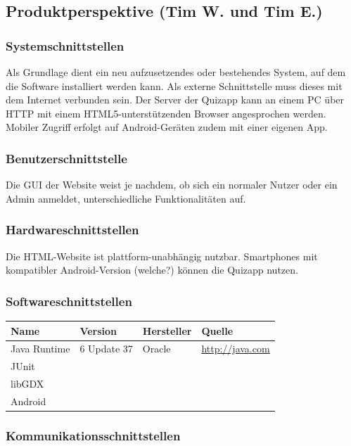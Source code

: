 \documentclass[fontsize=12pt,paper=a4,twoside]{scrartcl}
\begin{document}
\subsection{Produktperspektive (Tim W. und Tim E.)}
  
\subsubsection{Systemschnittstellen}
  
Als Grundlage dient ein neu aufzusetzendes oder bestehendes System, auf dem die Software installiert werden kann. Als externe Schnittstelle muss dieses mit dem Internet verbunden sein. Der Server der Quizapp kann an einem PC über HTTP mit einem HTML5-unterstützenden Browser angesprochen werden. Mobiler Zugriff erfolgt auf Android-Geräten zudem mit einer eigenen App.

\subsubsection{Benutzerschnittstelle}

Die GUI der Website weist je nachdem, ob sich ein normaler Nutzer oder ein Admin anmeldet, unterschiedliche Funktionalitäten auf. 

\subsubsection{Hardwareschnittstellen}

Die HTML-Website ist plattform-unabhängig nutzbar. Smartphones mit kompatibler Android-Version (welche?) können die Quizapp nutzen.


\subsubsection{Softwareschnittstellen}

  \begin{tabular}{|l|l|l|l|}\hline
    \textbf{Name} & \textbf{Version} & \textbf{Hersteller} & \textbf{Quelle} \\\hline
    Java Runtime & 6 Update 37 & Oracle & \url{http://java.com} \\\hline
    JUnit & & & \\\hline
    libGDX &  &  & \\\hline
    Android & & & \\\hline
  \end{tabular}

\subsubsection{Kommunikationsschnittstellen}
  
\end{document}
